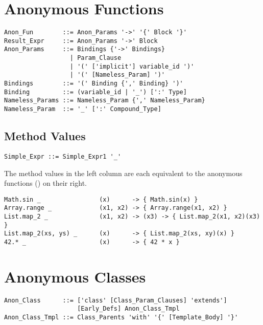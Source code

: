 \section{Anonymous Functions}
\label{sec:anonymous-functions}

\syntax\begin{lstlisting}
Anon_Fun        ::= Anon_Params '->' '{' Block '}'
Result_Expr     ::= Anon_Params '->' Block 
Anon_Params     ::= Bindings {'->' Bindings}
                  | Param_Clause
                  | '(' ['implicit'] variable_id ')'
                  | '(' [Nameless_Param] ')'
Bindings        ::= '(' Binding {',' Binding} ')'
Binding         ::= (variable_id | '_') [':' Type]
Nameless_Params ::= Nameless_Param {',' Nameless_Param}
Nameless_Param  ::= '_' [':' Compound_Type]
\end{lstlisting}







\subsection{Method Values}

\syntax\begin{lstlisting}
Simple_Expr ::= Simple_Expr1 '_'
\end{lstlisting}

\example The method values in the left column are each equivalent to the anonymous functions () on their right. 
\begin{lstlisting}[deletekeywords={range}]
Math.sin _                (x)      -> { Math.sin(x) }
Array.range _             (x1, x2) -> { Array.range(x1, x2) }
List.map_2 _              (x1, x2) -> (x3) -> { List.map_2(x1, x2)(x3) }
List.map_2(xs, ys) _      (x)      -> { List.map_2(xs, xy)(x) }
42.* _                    (x)      -> { 42 * x }
\end{lstlisting}







\section{Anonymous Classes}
\label{sec:anonymous-classes}

\syntax\begin{lstlisting}
Anon_Class      ::= ['class' [Class_Param_Clauses] 'extends'] 
                    [Early_Defs] Anon_Class_Tmpl
Anon_Class_Tmpl ::= Class_Parents 'with' '{' [Template_Body] '}'
\end{lstlisting}

